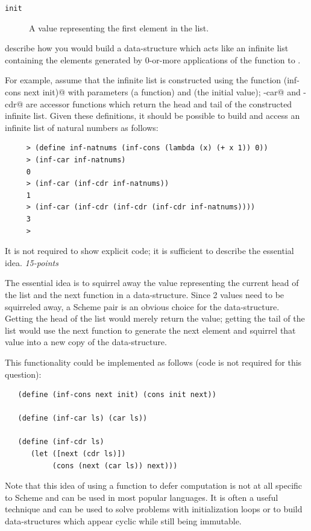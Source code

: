 \documentclass[12pt]{article}
\begin{document}
\begin{enumerate}
\begin{description}
\item[\texttt{init}] 
 A value representing the first element in the list.
\end{description}

  describe how you would build a
  data-structure which acts like an infinite list containing the
  elements generated by 0-or-more applications of the \verb@next@
  function to \verb@init@.

  For example, assume that the infinite list is constructed using the
  function \verb@(inf-cons next init)@ with parameters \verb@next@ (a
  function) and \verb@init@ (the initial value); \verb@inf-car@ and
  \verb@inf-cdr@ are accessor functions which return the head and tail
  of the constructed infinite list.  Given these definitions, it
  should be possible to build and access an infinite list of natural
  numbers as follows:

   \begin{verbatim}
     > (define inf-natnums (inf-cons (lambda (x) (+ x 1)) 0))
     > (inf-car inf-natnums)
     0
     > (inf-car (inf-cdr inf-natnums))
     1
     > (inf-car (inf-cdr (inf-cdr (inf-cdr inf-natnums))))
     3
     >   
   \end{verbatim}

   It is not required to show explicit code; it is sufficient to
   describe the essential idea.  \hfill{\textit{15-points}}

   The essential idea is to squirrel away the value representing the
   current head of the list and the next function in a data-structure.
   Since 2 values need to be squirreled away, a Scheme pair is an
   obvious choice for the data-structure.  Getting the head of the
   list would merely return the value; getting the tail of the list
   would use the next function to generate the next element and
   squirrel that value into a new copy of the data-structure.

   This functionality could be implemented as follows (code is not
   required for this question):

\begin{verbatim}
   (define (inf-cons next init) (cons init next))

   (define (inf-car ls) (car ls))

   (define (inf-cdr ls) 
      (let ([next (cdr ls)]) 
           (cons (next (car ls)) next)))  
\end{verbatim}

Note that this idea of using a function to defer computation is
not at all specific to Scheme and can be used in most popular
languages.  It is often a useful technique and can be used to
solve problems with initialization loops or to build data-structures
which appear cyclic while still being immutable.


\end{enumerate}
\end{document}

